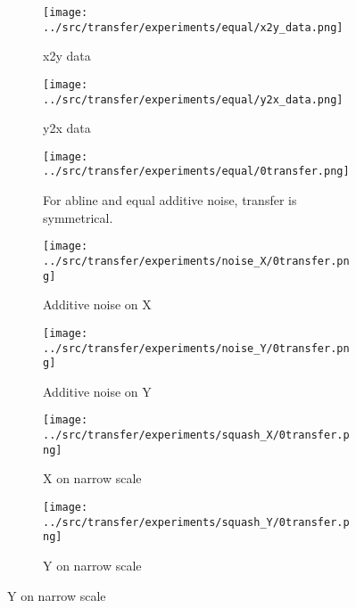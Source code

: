 \documentclass{article}
\begin{document}
\begin{figure}[H]
    \centering
    \begin{subfigure}{.32\linewidth}
        \centering
        \texttt{[image: ../src/transfer/experiments/equal/x2y\_data.png]}
        \caption{x2y data}
    \end{subfigure}
    \begin{subfigure}{.32\linewidth}
        \centering
        \texttt{[image: ../src/transfer/experiments/equal/y2x\_data.png]}
        \caption{y2x data}
    \end{subfigure}
    \begin{subfigure}{.32\linewidth}
        \centering
        \texttt{[image: ../src/transfer/experiments/equal/0transfer.png]}
        \caption{For abline and equal additive noise, transfer is symmetrical.}
    \end{subfigure}
    \hfill
    \begin{subfigure}{.49\linewidth}
        \centering
        \texttt{[image: ../src/transfer/experiments/noise\_X/0transfer.png]}
        \caption{Additive noise on X}
    \end{subfigure}
    \hfill
    \begin{subfigure}{.49\linewidth}
        \centering
        \texttt{[image: ../src/transfer/experiments/noise\_Y/0transfer.png]}
        \caption{Additive noise on Y}
    \end{subfigure}
    \hfill
    \begin{subfigure}{.49\linewidth}
        \centering
        \texttt{[image: ../src/transfer/experiments/squash\_X/0transfer.png]}
        \caption{X on narrow scale}
    \end{subfigure}
    \hfill
    \begin{subfigure}{.49\linewidth}
        \centering
        \texttt{[image: ../src/transfer/experiments/squash\_Y/0transfer.png]}
        \caption{Y on narrow scale}
    \end{subfigure}
    \hfill
\end{figure}
\end{document}
